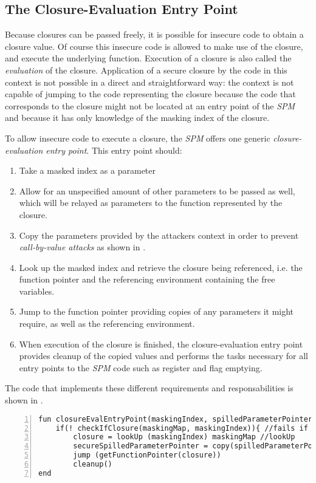 \documentclass[10pt,a4paper,master=cws, masteroption=ai,english,inputenc=utf8]{kulemt}
\begin{document}
\subsection{The Closure-Evaluation Entry Point}

Because closures can be passed freely, it is possible for insecure code to obtain a closure value.
Of course this insecure code is allowed to make use of the closure, and execute the underlying function.
Execution of a closure is also called the \emph{evaluation} of the closure.
Application of a secure closure by the code in this context is not possible in a direct and straightforward way: the context is not capable of jumping to the code representing the closure because the code that corresponds to the closure might not be located at an entry point of the \emph{SPM} and because it has only knowledge of the masking index of the closure.

To allow insecure code to execute a closure, the \emph{SPM} offers one generic \emph{closure-evaluation entry point}. This entry point should:

\begin{enumerate}
\item Take a masked index as a parameter
\item Allow for an unspecified amount of other parameters to be passed as well, which will be relayed as parameters to the function represented by the closure.
\item Copy the parameters provided by the attackers context in order to prevent \emph{call-by-value attacks} as shown in .
\item Look up the masked index and retrieve the closure being referenced, i.e. the function pointer and the referencing environment containing the free variables.
\item Jump to the function pointer providing copies of any parameters it might require, as well as the referencing environment.
\item When execution of the closure is finished, the closure-evaluation entry point provides cleanup of the copied values and performs the tasks necessary for all entry points to the \emph{SPM} code such as register and flag emptying.
\end{enumerate}

The code that implements these different requirements and responsabilities is shown in .

\begin{lstlisting}[frame=single,numbers=left, language={[x86masm]Assembler}, caption=The generic closure-evaluation entry point.,
label=llvm:EvalEntryPoint]
fun closureEvalEntryPoint(maskingIndex, spilledParameterPointer)
    if(! checkIfClosure(maskingMap, maskingIndex)){ //fails if the index does not exist or does not reference a closure.
        closure = lookUp (maskingIndex) maskingMap //lookUp
        secureSpilledParameterPointer = copy(spilledParameterPointer)
        jump (getFunctionPointer(closure))
        cleanup()
end 
\end{lstlisting}
\end{document}

